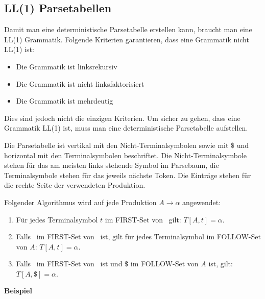 \subsection{LL(1) Parsetabellen}

Damit man eine deterministische Parsetabelle erstellen kann, braucht man eine
LL(1) Grammatik. Folgende Kriterien garantieren, dass eine Grammatik nicht LL(1)
ist:

\begin{itemize}
	\item Die Grammatik ist linksrekursiv
	\item Die Grammatik ist nicht linksfaktorisiert
	\item Die Grammatik ist mehrdeutig
\end{itemize}

Dies sind jedoch nicht die einzigen Kriterien. Um sicher zu gehen, dass eine
Grammatik LL(1) ist, muss man eine deterministische Parsetabelle aufstellen.

Die Parsetabelle ist vertikal mit den Nicht-Terminalsymbolen sowie mit $\$$
und horizontal mit den Terminalsymbolen beschriftet. Die Nicht-Terminalsymbole stehen für das am meisten links stehende Symbol im Parsebaum, die Terminalsymbole stehen für das jeweils nächste Token. Die Einträge stehen für die rechte Seite der verwendeten Produktion.

Folgender Algorithmus wird auf jede Produktion $A \rightarrow \alpha$ angewendet:

\begin{enumerate}
	\item Für jedes Terminalsymbol $t$ im FIRST-Set von \textalpha\ gilt: $T[A,t]
		= \alpha$.
	\item Falls \textepsilon\ im FIRST-Set von \textalpha\ ist, gilt für jedes
		Terminalsymbol im FOLLOW-Set von $A$: $T[A,t] = \alpha$.
	\item Falls \textepsilon\ im FIRST-Set von \textalpha\ ist und $\$$ im
		FOLLOW-Set von $A$ ist, gilt: $T[A,\$] = \alpha$.
\end{enumerate}

\textbf{Beispiel}

